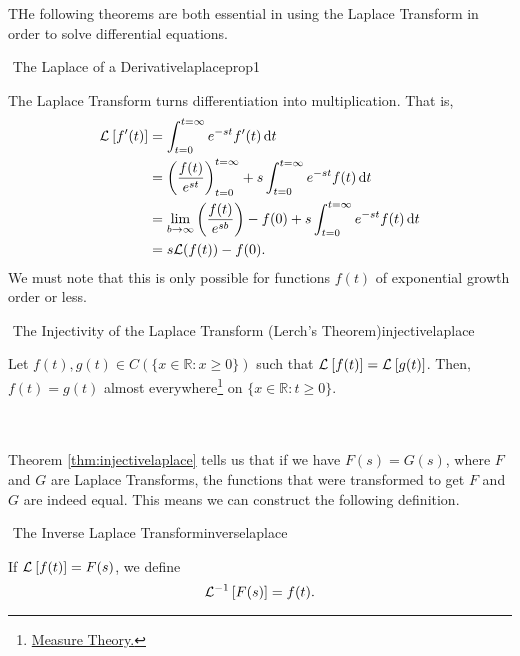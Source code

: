         THe following theorems are both essential in using the Laplace Transform in order to solve differential equations.
        \begin{theorem}{\Stop\,\,The Laplace of a Derivative}{laplaceprop1}
    
            The Laplace Transform turns differentiation into multiplication. That is, 
            \begin{align*}
                \laplace{f'(t)}&=\int_{t=0}^{t=\infty}e^{-st}f'(t)\dd t \\
                &=\left(\frac{f(t)}{e^{st}}\right)_{t=0}^{t=\infty}+s\int_{t=0}^{t=\infty} e^{-st}f(t) \dd t  \\
                &=\lim_{b\to\infty}\left(\frac{f(t)}{e^{sb}}\right)-f(0)+s\int_{t=0}^{t=\infty} e^{-st}f(t) \dd t \\
                &=s\mathcal{L}(f(t))-f(0).
            \end{align*}
            We must note that this is only possible for functions \(f(t)\) of exponential growth order or less.
        
        \end{theorem}
        \begin{theorem}{\Stop\,\,The Injectivity of the Laplace Transform (Lerch's Theorem)}{injectivelaplace}

            Let \(f(t),g(t)\in C(\{x\in\mathbb{R}:x\geq0\})\) such that \(\laplace{f(t)}=\laplace{g(t)}\). Then, \(f(t)=g(t)\) almost everywhere\footnote{\href{https://en.wikipedia.org/wiki/Almost_everywhere}{Measure Theory.}} on \(\{x\in\mathbb{R}:t\geq0\}\).
            
        \end{theorem}
        \vphantom
        \\
        \\
        Theorem \ref{thm:injectivelaplace} tells us that if we have \(F(s)=G(s)\), where \(F\) and \(G\) are Laplace Transforms, the functions that were transformed to get \(F\) and \(G\) are indeed equal. This means we can construct the following definition.
        \begin{definition}{\Stop\,\,The Inverse Laplace Transform}{inverselaplace}

            If \(\laplace{f(t)}=F(s)\), we define
            \begin{equation*}
                \laplace[-1]{F(s)}=f(t).
            \end{equation*}
            
        \end{definition}
